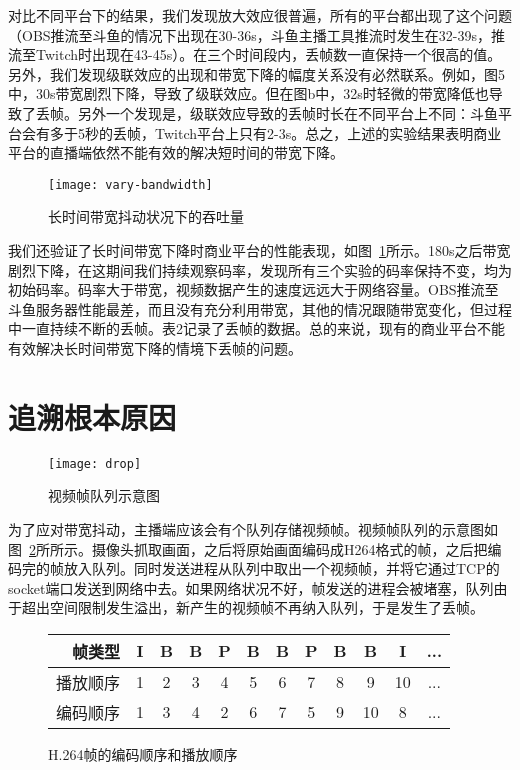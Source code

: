 对比不同平台下的结果，我们发现放大效应很普遍，所有的平台都出现了这个问题（OBS推流至斗鱼的情况下出现在30-36s，斗鱼主播工具推流时发生在32-39s，推流至Twitch时出现在43-45s）。在三个时间段内，丢帧数一直保持一个很高的值。另外，我们发现级联效应的出现和带宽下降的幅度关系没有必然联系。例如，图5中，30s带宽剧烈下降，导致了级联效应。但在图b中，32s时轻微的带宽降低也导致了丢帧。另外一个发现是，级联效应导致的丢帧时长在不同平台上不同：斗鱼平台会有多于5秒的丢帧，Twitch平台上只有2-3s。总之，上述的实验结果表明商业平台的直播端依然不能有效的解决短时间的带宽下降。

\begin{figure}[H]%
  \centering
  \texttt{[image: vary-bandwidth]}
  \caption{长时间带宽抖动状况下的吞吐量}
  \label{fig:vary-bandwidth}
\end{figure}

我们还验证了长时间带宽下降时商业平台的性能表现，如图~\ref{fig:vary-bandwidth}所示。180s之后带宽剧烈下降，在这期间我们持续观察码率，发现所有三个实验的码率保持不变，均为初始码率。码率大于带宽，视频数据产生的速度远远大于网络容量。OBS推流至斗鱼服务器性能最差，而且没有充分利用带宽，其他的情况跟随带宽变化，但过程中一直持续不断的丢帧。表2记录了丢帧的数据。总的来说，现有的商业平台不能有效解决长时间带宽下降的情境下丢帧的问题。

\section{追溯根本原因}

\begin{figure}[H]%
  \centering
  \texttt{[image: drop]}
  \caption{视频帧队列示意图}
  \label{fig:drop}
\end{figure}

为了应对带宽抖动，主播端应该会有个队列存储视频帧。视频帧队列的示意图如图~\ref{fig:drop}所所示。摄像头抓取画面，之后将原始画面编码成H264格式的帧，之后把编码完的帧放入队列。同时发送进程从队列中取出一个视频帧，并将它通过TCP的socket端口发送到网络中去。如果网络状况不好，帧发送的进程会被堵塞，队列由于超出空间限制发生溢出，新产生的视频帧不再纳入队列，于是发生了丢帧。

\begin{figure}
\centering
{\setlength{\tabcolsep}{3pt}
\begin{tabular}{|r||ccccccccc|cc|}
\hline
帧类型       & I & B & B & P & B & B & P & B & B  & I  & ... \\ \hline
播放顺序   & 1 & 2 & 3 & 4 & 5 & 6 & 7 & 8 & 9  & 10 & ... \\ \hline
编码顺序 & 1 & 3 & 4 & 2 & 6 & 7 & 5 & 9 & 10 & 8  & ... \\
\hline
\end{tabular}}
\caption{H.264帧的编码顺序和播放顺序}
\label{fig:frame-order}
\end{figure}

